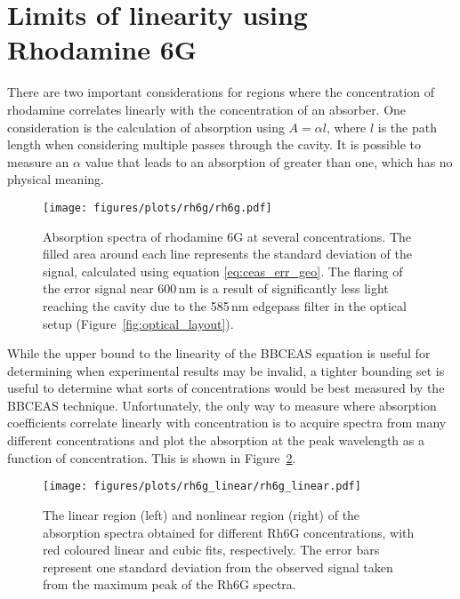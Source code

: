 \section{Limits of linearity using Rhodamine 6G}\label{sec:rhodamine}

There are two important considerations for regions where the concentration of
rhodamine correlates linearly with the concentration of an absorber. One
consideration is the calculation of absorption using $A = \alpha  l$, where $l$
is the path length when considering multiple passes through the cavity.  It is
possible to measure an $\alpha$ value that leads to an absorption of greater
than one, which has no physical meaning.

\begin{figure}
\begin{center}
  \texttt{[image: figures/plots/rh6g/rh6g.pdf]}
\end{center}
\caption[Rhodamine 6G Absorption Spectra as a Calibration]{Absorption spectra of rhodamine 6G at several concentrations. The filled area around each line represents the standard deviation of the signal, calculated using equation \eqref{eq:ceas_err_geo}. The flaring of the error signal near 600\,nm is a result of significantly less light reaching the cavity due to the 585\,nm edgepass filter in the optical setup (Figure~\ref{fig:optical_layout}).}
\label{fig:rh6g}
\end{figure}


While the upper bound to the linearity of the \ac{BBCEAS} equation is useful
for determining when experimental results may be invalid, a tighter bounding
set is useful to determine what sorts of concentrations would be best
measured by the \ac{BBCEAS} technique. Unfortunately, the only way to measure
where absorption coefficients correlate linearly with concentration is to
acquire spectra from many different concentrations and plot the absorption
at the peak wavelength as a function of concentration. This is shown in
Figure~\ref{fig:rh6g_lin}.

\begin{figure}[th]
\begin{center}
  \texttt{[image: figures/plots/rh6g\_linear/rh6g\_linear.pdf]}
\end{center}
\caption[Dynamic Range of Rhodamine 6G Measurements with \ac{BBCEAS}]{The linear region (left) and nonlinear region (right) of the absorption spectra obtained for different Rh6G concentrations, with red coloured linear and cubic fits, respectively. The error bars represent one standard deviation from the observed signal taken from the maximum peak of the Rh6G spectra.}
\label{fig:rh6g_lin}
\end{figure}

